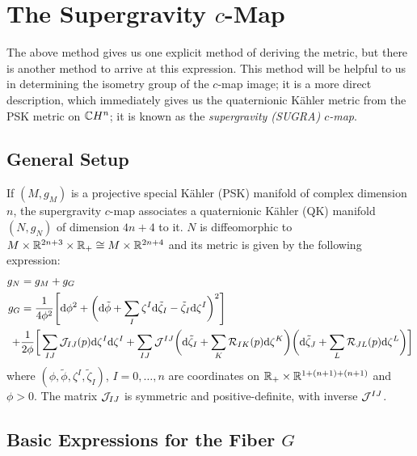 \section{The Supergravity \texorpdfstring{$c$}{c}-Map}

The above method gives us one explicit method of deriving the metric, but there is another method to arrive at this expression. This method will be helpful to us in determining the isometry group of the $c$-map image; it is a more direct description, which immediately gives us the quaternionic K\"ahler metric from the PSK metric on $\mathbb{C} H^n$; it is known as the \emph{supergravity (SUGRA) $c$-map}.

\subsection{General Setup}

If $(M,g_M)$ is a projective special K\"ahler (PSK) manifold of complex dimension $n$, the supergravity $c$-map associates a quaternionic K\"ahler (QK) manifold $(N,g_N)$ of dimension $4n+4$ to it. $N$ is diffeomorphic to $M\times \mathbb{R}^{2n+3}\times \mathbb{R}_+\cong M\times \mathbb{R}^{2n+4}$ and its metric is given by the following expression:
\begin{align*}
	g_N&=g_M+g_G\\
	g_G&=\frac{1}{4\phi^2}\Bigg[\mathrm{d} \phi^2
	+\bigg(\mathrm{d} \tilde{\phi}+\sum_I \zeta^I \mathrm{d} \tilde{\zeta}_I-\tilde{\zeta}_I \mathrm{d} \zeta^I\bigg)^2\Bigg]\\
	+&\frac{1}{2\phi}\bigg[\sum_{IJ} \mathcal{J}_{IJ}(p)\mathrm{d} \zeta^I\mathrm{d}\zeta^I+
	\sum_{IJ}\mathcal{J}^{IJ}\bigg(\mathrm{d} \tilde \zeta_I+\sum_K \mathcal{R}_{IK}(p)\mathrm{d} \zeta^K\bigg)
	\bigg(\mathrm{d}\tilde \zeta_J + \sum_L \mathcal{R}_{JL}(p)\mathrm{d} \zeta^L\bigg)\bigg]
\end{align*}
where $(\phi,\tilde\phi,\zeta^I,\tilde\zeta_I)$, $I=0,\dots, n$ are coordinates on $\mathbb{R}_+\times \mathbb{R}^{1+(n+1)+(n+1)}$ and $\phi>0$. The matrix $\mathcal{J}_{IJ}$ is symmetric and positive-definite, with inverse $\mathcal{J}^{IJ}$. 

\subsection{Basic Expressions for the Fiber \texorpdfstring{$G$}{G}}

